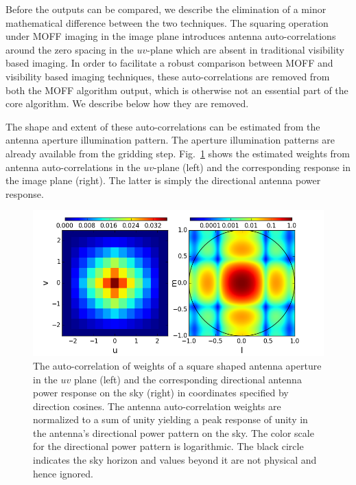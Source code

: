 \documentclass[a4paper,fleqn,usenatbib]{mnras}
\begin{document}
Before the outputs can be compared, we describe the elimination of a minor 
mathematical difference between the two techniques. The squaring operation under 
MOFF imaging in the image plane introduces antenna auto-correlations around the 
zero spacing in the $uv$-plane which are absent in traditional visibility based 
imaging. In order to facilitate a robust comparison between MOFF and visibility 
based imaging techniques, these auto-correlations are removed from both the MOFF 
algorithm output, which is otherwise not an essential part of the core algorithm. 
We describe below how they are removed. 

The shape and extent of these auto-correlations can be estimated from the 
antenna aperture illumination pattern. The aperture illumination patterns
are already available from the gridding step. Fig.~\ref{fig:autocorr_wts_PB} 
shows the estimated weights from antenna auto-correlations in the $uv$-plane 
(left) and the corresponding response in the image plane (right). The latter 
is simply the directional antenna power response. 

\begin{figure}
  \includegraphics[width=\columnwidth]{autocorr_uvwts_pbeam}
  \caption{The auto-correlation of weights of a square shaped antenna aperture
    in the $uv$ plane (left) and the corresponding directional antenna power 
    response on the sky (right) in coordinates specified by direction cosines. 
    The antenna auto-correlation weights are normalized to a sum
    of unity yielding a peak response of unity in the antenna's directional
    power pattern on the sky. The color scale for the directional power 
    pattern is logarithmic. The black circle indicates the sky horizon and
    values beyond it are not physical and hence ignored.}
  \label{fig:autocorr_wts_PB}
\end{figure}
\end{document}
